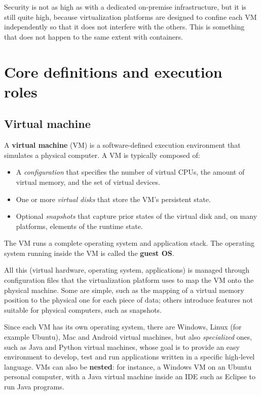 Security is not as high as with a dedicated on-premise infrastructure, but it is still quite high, because virtualization platforms are designed to confine each VM independently so that it does not interfere with the others. This is something that does not happen to the same extent with containers.

\section{Core definitions and execution roles}

\subsection{Virtual machine}

A \textbf{virtual machine} (VM) is a software-defined execution environment that simulates a physical computer. A VM is typically composed of:

\begin{itemize}
\item A \emph{configuration} that specifies the number of virtual CPUs, the amount of virtual memory, and the set of virtual devices.
\item One or more \emph{virtual disks} that store the VM's persistent state.
\item Optional \emph{snapshots} that capture prior states of the virtual disk and, on many platforms, elements of the runtime state.
\end{itemize}

The VM runs a complete operating system and application stack. The operating system running inside the VM is called the \textbf{guest OS}.

All this (virtual hardware, operating system, applications) is managed through configuration files that the virtualization platform uses to map the VM onto the physical machine. Some are simple, such as the mapping of a virtual memory position to the physical one for each piece of data; others introduce features not suitable for physical computers, such as snapshots.

Since each VM has its own operating system, there are Windows, Linux (for example Ubuntu), Mac and Android virtual machines, but also \emph{specialized} ones, such as Java and Python virtual machines, whose goal is to provide an easy environment to develop, test and run applications written in a specific high-level language. VMs can also be \textbf{nested}: for instance, a Windows VM on an Ubuntu personal computer, with a Java virtual machine inside an IDE such as Eclipse to run Java programs.

